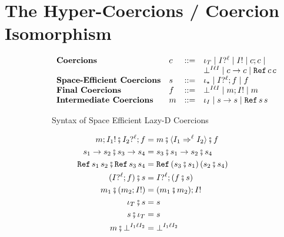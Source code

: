 \documentclass[acmtog, authorversion, acmlarge]{acmart}
\begin{document}
\section{The Hyper-Coercions / Coercion Isomorphism}
\begin{figure}[tbh]
  \centering
  \begin{subfigure}{.5\textwidth}
    \[
    \begin{array}{llcl}
      \textbf {Coercions}&
      \Crcn & ::= & \id[\T] \mid \prj[\I]{\Lbl} \mid \inj[\I] \mid %
                    \Seq{\Crcn}{\Crcn} \mid \\
      &     &     & \failed{\I}{\Lbl}{\I} \mid %
                    \fn{\Crcn}{\Crcn} \mid \rf{\Crcn}{\Crcn}\\
      \textbf{Space-Efficient Coercions}&
      \SE  & ::= & \id[\Dyn] \mid \Seq{\prj[\I]{\Lbl}}{\Fnl} \mid \Fnl \\
      \textbf{Final Coercions}&
      \Fnl  & ::= & \failed{\I}{\Lbl}{\I} \mid \Seq{\Int}{\inj[\I]} \mid \Int \\
      \textbf{Intermediate Coercions}&
      \Int  & ::= & \id[\I] \mid \fn{\SE}{\SE} \mid \rf{\SE}{\SE}\\
    \end{array}
    \]
    \caption{Syntax of Space Efficient Lazy-D Coercions}
    \label{fig:hcSyntax}
  \end{subfigure}
  \begin{subfigure}{.5\textwidth}
    \begin{align*}
      \cmp{\Seq{\Int}{\inj[\I_1]}}
          {\Seq{\prj[\I_2]{\Lbl}}{\Fnl}} &=%
          \cmp{\Int}
              {\cmp{\mkcrcn{\I_1}{\I_2}}
                   {\Fnl}}%
    \\
      \cmp{\fn{\SE_1}{\SE_2}}
          {\fn{\SE_3}{\SE_4}} &=
          \fn{\cmp{\SE_3}{\SE_1}}
             {\cmp{\SE_2}{\SE_4}}
    \\
    \cmp{\rf{\SE_1}{\SE_2}}{\rf{\SE_3}{\SE_4}} &=
    \rf{(\cmp{\SE_3}{\SE_1})}{(\cmp{\SE_2}{\SE_4})}
    \\
    \cmp{(\Seq{\prj[\I]{\Lbl}}{\Fnl})}{\SE} &=
    \Seq{\prj[\I]{\Lbl}}{(\cmp{\Fnl}{\SE})}
    \\
    \cmp{\Int_1}{(\Seq{\Int_2}{\inj[\I]})} &=
    \Seq{(\cmp{\Int_1}{\Int_2})}{\inj[\I]}
    \\
    \cmp{\id[\T]}{\SE} &= \SE
    \\
    \cmp{\SE}{\id[\T]} &= \SE
    \\
    \cmp{\Int}{\failed{\I_1}{\Lbl}{\I_2}} &=
    \failed{\I_1}{\Lbl}{\I_2}

\end{align*}
\end{subfigure}
\end{figure}
\end{document}
